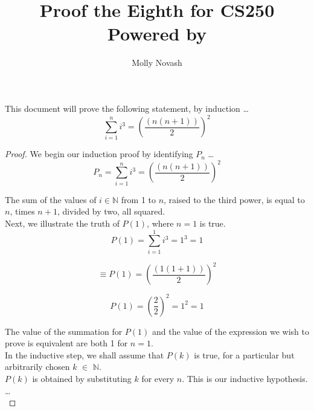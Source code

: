 \documentclass[12pt]{article}
\author{Molly Novash}
\title{%
\Huge Proof the Eighth for CS250  \\
\normalsize Powered by \LaTeXe}
\begin{document}
\sloppy
\maketitle
\bigskip

This document will prove the following statement, by induction \ldots \\

\begin{equation}
\sum_{i = 1}^{n} i^{3} = \left(\frac{(n(n + 1))}{2}\right)^2
\end{equation}
\bigskip

\begin{proof}
We begin our induction proof by identifying $P_{n}$ \ldots \\

\begin{equation}
P_{n} = \sum_{i = 1}^{n} i^{3} = \left(\frac{(n(n + 1))}{2}\right)^2
\end{equation}
\bigskip

The sum of the values of $i \in \mathbb{N}$ from 1 to $n$, raised to the third power, is equal to $n$, times $n + 1$, divided by two, all squared. \\

Next, we illustrate the truth of $P(1)$, where $n = 1$ is true. \\

\begin{equation}
P(1) = \sum_{i = 1}^{1} i^{3} = 1^3 = 1
\end{equation}

\begin{equation}
\equiv P(1) = \left(\frac{(1(1+1))}{2}\right)^2
\end{equation}

\begin{equation}
P(1) = \left(\frac{2}{2}\right)^2 = 1^2 = 1
\end{equation}
\bigskip

The value of the summation for $P(1)$ and the value of the expression we wish to prove is equivalent are both 1 for $n = 1$. \\

In the inductive step, we shall assume that $P(k)$ is true, for a particular but arbitrarily chosen $k$ $\in$ $\mathbb{N}$. \\

$P(k)$ is obtained by substituting $k$ for every $n$. This is our inductive hypothesis. \ldots \\


\end{proof}
\end{document}
